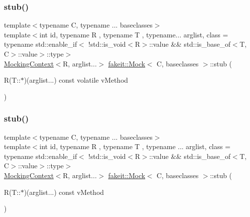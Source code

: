 \mbox{\label{classfakeit_1_1Mock_a963fce628ddab338bc3ee984a137db31}} 
\subsubsection{\texorpdfstring{stub()}{stub()}\hspace{0.1cm}{\footnotesize\ttfamily [18/72]}}
{\footnotesize\ttfamily template$<$typename C, typename ... baseclasses$>$ \\
template$<$int id, typename R , typename T , typename... arglist, class  = typename std\+::enable\+\_\+if$<$                !std\+::is\+\_\+void$<$\+R$>$\+::value \&\& std\+::is\+\_\+base\+\_\+of$<$\+T, C$>$\+::value$>$\+::type$>$ \\
\mbox{\hyperlink{classfakeit_1_1MockingContext}{Mocking\+Context}}$<$R, arglist...$>$ \mbox{\hyperlink{classfakeit_1_1Mock}{fakeit\+::\+Mock}}$<$ C, baseclasses $>$\+::stub (\begin{DoxyParamCaption}\item[{R(T\+::$\ast$)(arglist...) const volatile}]{v\+Method }\end{DoxyParamCaption})\hspace{0.3cm}{\ttfamily [inline]}}

\mbox{\label{classfakeit_1_1Mock_a7a8f38b58b068b35f263eee42d75c162}} 
\subsubsection{\texorpdfstring{stub()}{stub()}\hspace{0.1cm}{\footnotesize\ttfamily [19/72]}}
{\footnotesize\ttfamily template$<$typename C, typename ... baseclasses$>$ \\
template$<$int id, typename R , typename T , typename ... arglist, class  = typename std\+::enable\+\_\+if$<$                !std\+::is\+\_\+void$<$\+R$>$\+::value \&\& std\+::is\+\_\+base\+\_\+of$<$\+T, C$>$\+::value$>$\+::type$>$ \\
\mbox{\hyperlink{classfakeit_1_1MockingContext}{Mocking\+Context}}$<$R, arglist...$>$ \mbox{\hyperlink{classfakeit_1_1Mock}{fakeit\+::\+Mock}}$<$ C, baseclasses $>$\+::stub (\begin{DoxyParamCaption}\item[{R(T\+::$\ast$)(arglist...) const}]{v\+Method }\end{DoxyParamCaption})\hspace{0.3cm}{\ttfamily [inline]}}

